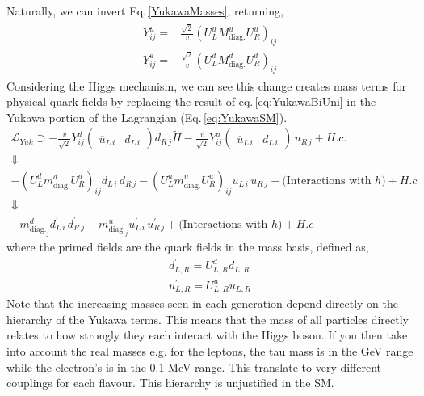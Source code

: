 Naturally, we can invert Eq.\,\ref{YukawaMasses}, returning, 
\begin{align}
\label{eq:YukawaBiUni}
\begin{split}
Y^u_{ij} = & \frac{\sqrt{2}}{v} (U_L^u M^u_{\text{diag.}} U_R^u)_{ij} \\
Y^d_{ij} = & \frac{\sqrt{2}}{v} (U_L^d M^d_{\text{diag.}} U_R^d)_{ij}
\end{split}
\end{align}
%
Considering the Higgs mechanism, we can see this change creates mass terms for physical quark fields by replacing the result of eq.\,\ref{eq:YukawaBiUni} in the Yukawa portion of the Lagrangian (Eq.\,\ref{eq:YukawaSM}).
%
\begin{gather}
\mathcal{L}_{Yuk} \supset 
- \frac{v}{\sqrt{2}} Y^d_{ij} \begin{pmatrix} \overline{u}_{L\,i} & \overline{d}_{L\,i}  \end{pmatrix}  d_{R\,j} \tilde{H}
%
-\frac{v}{\sqrt{2}} Y^u_{ij} \begin{pmatrix} \overline{u}_{L\,i} & \overline{d}_{L\,i}  \end{pmatrix} \, u_{R\,j} + H.c. \nonumber  \\ 
 \Downarrow \nonumber \\
-(U_L^d m^d_{\text{diag.}} U_R^d)_{ij} d_{L\,i} \, d_{R\,j}  - (U_L^u m^u_{\text{diag.}} U_R^u)_{ij} u_{L\,i} \, u_{R\,j} + \big(\text{Interactions with } h\big) + H.c \\ 
 \Downarrow  \nonumber \\ 
-m^d_{\text{diag.}_j} d_{L\,i}^\prime \, d_{R\,j}^\prime  - m^u_{\text{diag.}_j} u_{L\,i}^\prime \, u_{R\,j}^\prime + \big(\text{Interactions with }h\big) + H.c  \nonumber  
\end{gather}
%
where the primed fields are the quark fields in the mass basis, defined as, 
\begin{equation}
\begin{split}
d^\prime_{L,R} = U^d_{L,R} d_{L,R} \\
u^\prime_{L,R} = U^u_{L,R} u_{L,R} 
\end{split}  
\end{equation}
% 
Note that the increasing masses seen in each generation depend directly on the  hierarchy of the Yukawa terms. This means that the mass of all particles directly relates to how strongly they each interact with the Higgs boson.
%
If you then take into account the real masses e.g. for the leptons, the tau mass is in the GeV range while the electron's is in the 0.1 MeV range. This translate to very different couplings for each flavour. 
%
This hierarchy is unjustified in the SM. 

